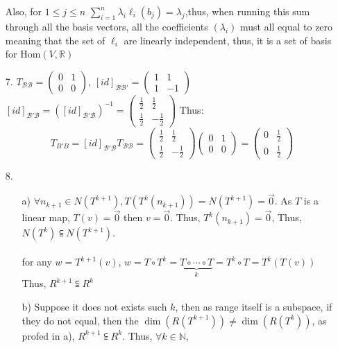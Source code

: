 \documentclass{article}
\begin{document}
\begin{itemize}
    Also, for \(1\leq j \leq n\) \(\sum_{i=1}^{n}\lambda_i\ell_i(b_j) = \lambda_j\),thus, when running this sum through all the basis vectors, all the coefficients \((\lambda_i)\) must all equal to zero meaning that the set of \(\ell _i\) are linearly independent, thus, it is a set of basis for \(\text{Hom}(V,\mathbb{R})\)
    \item [7.]
    \(T_{\mathcal{BB}} = \begin{pmatrix}
        0&1\\0&0
    \end{pmatrix}\), \([id]_{\mathcal{BB'}} = \begin{pmatrix}
        1&1\\1&-1
    \end{pmatrix}\)
    \([id]_{\mathcal{B'B}}  = \left([id]_{\mathcal{B'B}}\right)^{-1}= \begin{pmatrix}
        \frac{1}{2}&\frac{1}{2}\\\frac{1}{2}&-\frac{1}{2}
    \end{pmatrix}\) Thus: \[T_{B'B} = [id]_{\mathcal{B'B}}T_{\mathcal{BB}} = \begin{pmatrix}
        \frac{1}{2}&\frac{1}{2}\\\frac{1}{2}&-\frac{1}{2}
    \end{pmatrix}\begin{pmatrix}
        0&1\\0&0
    \end{pmatrix} = \begin{pmatrix}
        0&\frac{1}{2}\\0&\frac{1}{2}
    \end{pmatrix}\]
    \item [8.]
    \begin{itemize}
        \item [a)] \(\forall n_{k+1}\in N(T^{k+1}), T(T^k(n_{k+1})) = N(T^{k+1}) = \overrightarrow{0}\). As \(T\) is a linear map, \(T(v) = \overrightarrow{0}\) then \(v = \overrightarrow{0}\). Thus, \(T^k(n_{k+1})= \overrightarrow{0}\), Thus, \(N(T^k)\subseteqq N(T^{k+1})\).\\
        \\ 
        for any \(w = T^{k+1}(v)\), \(w = T\circ T^k = \underbrace{T\circ\cdots\circ T}_{k} = T^k \circ T = T^k(T(v))\)
        Thus, \(R^{k+1}\subseteqq R^k\)
        \item [b)]Suppose it does not exists such \(k\), then as range itself is a subspace, if they do not equal, then the \(\dim(R(T^{k+1}))\neq\dim(R(T^{k}))\), as profed in a), \(R^{k+1}\subseteqq R^k\). Thus, \(\forall k\in\mathbb{N}\), 

\end{itemize}
\end{itemize}
\end{document}
